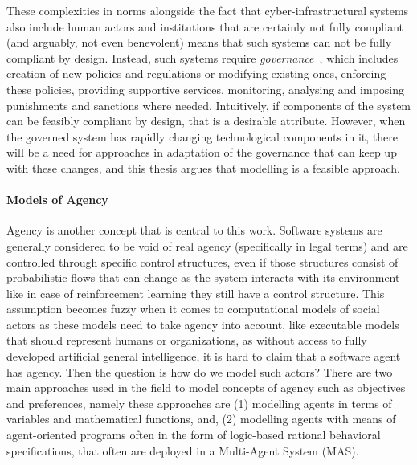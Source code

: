 
These complexities in norms alongside the fact that cyber-infrastructural systems also include human actors and institutions that are certainly not fully compliant (and arguably, not even benevolent) means that such systems can not be fully compliant by design. Instead, such systems require \textit{governance}~\cite{vanengers2010egoverment}, which includes creation of new policies and regulations or modifying existing ones, enforcing these policies, providing supportive services, monitoring, analysing and imposing punishments and sanctions where needed. Intuitively, if components of the system can be feasibly compliant by design, that is a desirable attribute. However, when the governed system has rapidly changing technological components in it, there will be a need for approaches in adaptation of the governance that can keep up with these changes, and this thesis argues that modelling is a feasible approach. 


\paragraph{Models of Agency}
Agency is another concept that is central to this work. Software systems are generally considered to be void of real agency (specifically in legal terms) and are controlled through specific control structures, even if those structures consist of probabilistic flows that can change as the system interacts with its environment like in case of reinforcement learning they still have a control structure. This assumption becomes fuzzy when it comes to computational models of social actors as these models need to take agency into account, like executable models that should represent humans or organizations, as without access to fully developed artificial general intelligence, it is hard to claim that a software agent has agency. Then the question is how do we model such actors? There are two main approaches used in the field to model concepts of agency such as objectives and preferences, namely these approaches are (1) modelling agents in terms of variables and mathematical functions, and, (2) modelling agents with means of agent-oriented programs often in the form of logic-based rational behavioral specifications, that often are deployed in a Multi-Agent System (MAS).


